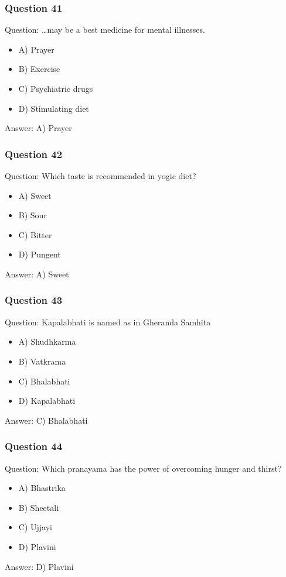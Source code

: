 \begin{frame}[fragile]\frametitle{Question 41}
Question: \ldots may be a best medicine for mental illnesses.
\begin{itemize}
\item A) Prayer
\item B) Exercise
\item C) Psychiatric drugs
\item D) Stimulating diet
\end{itemize}
Answer: A) Prayer
\end{frame}

\begin{frame}[fragile]\frametitle{Question 42}
Question: Which taste is recommended in yogic diet?
\begin{itemize}
\item A) Sweet
\item B) Sour
\item C) Bitter
\item D) Pungent
\end{itemize}
Answer: A) Sweet
\end{frame}

\begin{frame}[fragile]\frametitle{Question 43}
Question: Kapalabhati is named as in Gheranda Samhita
\begin{itemize}
\item A) Shudhkarma
\item B) Vatkrama
\item C) Bhalabhati
\item D) Kapalabhati
\end{itemize}
Answer: C) Bhalabhati
\end{frame}

\begin{frame}[fragile]\frametitle{Question 44}
Question: Which pranayama has the power of overcoming hunger and thirst?
\begin{itemize}
\item A) Bhastrika
\item B) Sheetali
\item C) Ujjayi
\item D) Plavini
\end{itemize}
Answer: D) Plavini
\end{frame}


